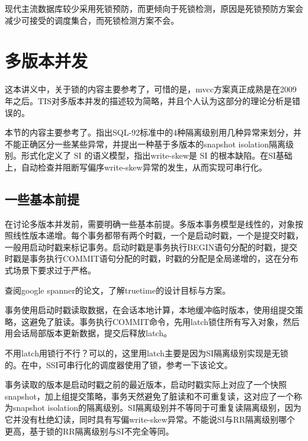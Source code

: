 现代主流数据库较少采用死锁预防，而更倾向于死锁检测，原因是死锁预防方案会减少可接受的调度集合，而死锁检测方案不会。

\section{多版本并发}

这本讲义中，关于锁的内容主要参考了\cite{Weikum2001Transactional}，可惜的是，mvcc方案真正成熟是在2009年之后。TIS\cite{Weikum2001Transactional}对多版本并发的描述较为简略，并且个人认为这部分的理论分析是错误的。

本节的内容主要参考了\cite{berenson1995critique, fekete2005making, cahill2009serializable}。\cite{berenson1995critique}指出SQL-92标准中的4种隔离级别用几种异常来划分，并不能正确区分一些某些异常，并提出一种基于多版本的snapshot isolation隔离级别。\cite{fekete2005making}形式化定义了 SI 的语义模型，指出write-skew是 SI 的根本缺陷。\cite{cahill2009serializable}在SI基础上，自动检查并阻断写偏序write-skew异常的发生，从而实现可串行化。

\subsection{一些基本前提}

在讨论多版本并发前，需要明确一些基本前提。多版本事务模型是线性的，对象按照线性版本递增。每个事务都带有两个时戳，一个是启动时戳，一个是提交时戳\cite{berenson1995critique}，一般用启动时戳来标记事务。启动时戳是事务执行BEGIN语句分配的时戳，提交时戳是事务执行COMMIT语句分配的时戳，时戳的分配是全局递增的，这在分布式场景下要求过于严格。

\begin{exercise}
    查阅google spanner的论文，了解truetime的设计目标与方案。
\end{exercise}

事务使用启动时戳读取数据，在会话本地计算，本地缓冲临时版本，使用组提交策略，这避免了脏读。事务执行COMMIT命令，先用latch锁住所有写入对象，然后用会话局部版本更新数据，提交后释放latch。

\begin{exercise}
    不用latch用锁行不行？可以的，这里用latch主要是因为SI隔离级别实现是无锁的。在\cite{cahill2009serializable}中，SSI可串行化的调度器使用了锁，参考一下该论文。
\end{exercise}

事务读取的版本是启动时戳之前的最近版本，启动时戳实际上对应了一个快照snapshot，加上组提交策略，事务天然避免了脏读和不可重复读，这对应了一个称为snapshot isolation的隔离级别\cite{berenson1995critique}。SI隔离级别并不等同于可重复读隔离级别，因为它并没有杜绝幻读，同时具有写偏write-skew异常。不能说SI与RR隔离级别哪个更高，基于锁的RR隔离级别与SI不完全等同。

